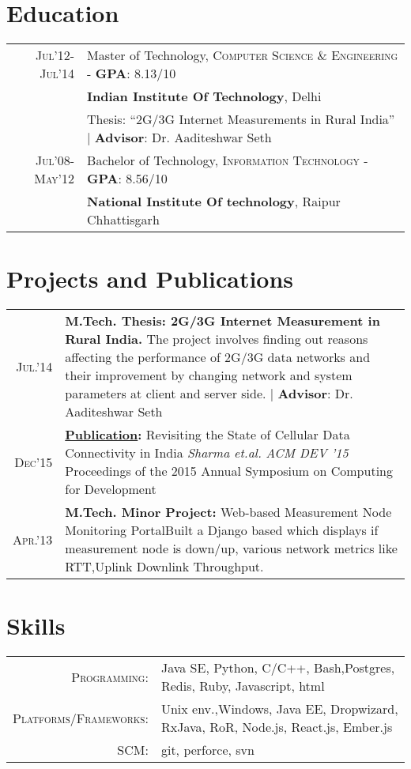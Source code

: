\documentclass[a4paper,10pt]{article}
\begin{document}
\section{Education}
\begin{tabular}{rp{15cm}}	
\textsc{Jul'12-Jul'14} & Master of Technology, \textsc{Computer Science \& Engineering} -  \textbf{GPA}: 8.13/10\\
&\normalsize \textbf{Indian Institute Of Technology}, Delhi\\
& Thesis: ``2G/3G Internet Measurements in Rural India'' | \small \textbf{ Advisor}: Dr. Aaditeshwar Seth\\
\textsc{Jul'08-May'12} & Bachelor of Technology, \textsc{Information Technology} - \textbf{GPA}: 8.56/10\\
&\normalsize \textbf{National Institute Of technology}, Raipur Chhattisgarh\\
\end{tabular}

\section{Projects and Publications}
\begin{tabular}{rp{15cm}}
 \textsc{Jul.'14} & \textbf{M.Tech. Thesis: 2G/3G Internet Measurement in Rural India.}
 \normalsize The project involves finding out reasons affecting
the performance of 2G/3G data networks and their improvement by changing
network and system parameters at client and server side.  | \small \textbf{ Advisor}: Dr. Aaditeshwar Seth\\
\textsc{Dec'15} & \textbf{\href{http://dl.acm.org/citation.cfm?id=2830649}{Publication}:} Revisiting the State of Cellular Data Connectivity in India \emph{Sharma et.al.} \emph{ACM DEV '15} Proceedings of the 2015 Annual Symposium on Computing for Development\\
\textsc{Apr.'13} & \textbf{M.Tech. Minor Project:} Web-based Measurement Node Monitoring Portal\normalsize Built a Django based which displays if measurement node is down/up, various network metrics like RTT,Uplink Downlink Throughput.
\end{tabular}

\section{Skills}
\begin{tabular}{rp{15cm}}
\textsc{Programming:} & Java SE, Python, C/C++, Bash,Postgres, Redis, Ruby, Javascript, html\\
\textsc{Platforms/Frameworks:} & Unix env.,Windows, Java EE, Dropwizard, RxJava, RoR, Node.js, React.js, Ember.js\\
\textsc{SCM:} & git, perforce, svn\\
\end{tabular}
\end{document}
